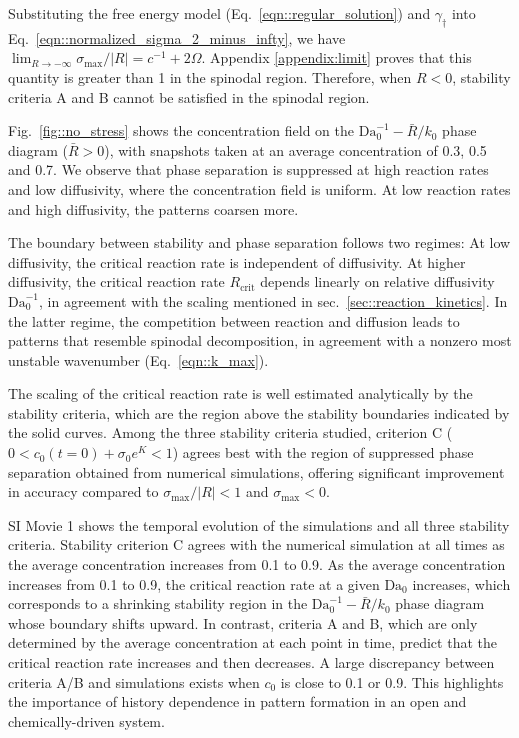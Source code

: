 \documentclass[reprint,aps,pre,superscriptaddress]{revtex4-2}
\begin{document}
Substituting the free energy model (Eq.~\ref{eqn::regular_solution}) and $\gamma_\dagger$ into Eq.~\ref{eqn::normalized_sigma_2_minus_infty},
we have $\lim_{R\to-\infty}{\sigma_\text{max}/|R|}=c^{-1}+2\Omega$. Appendix \ref{appendix:limit} proves that this quantity is greater than 1 in the spinodal region.
Therefore, when $R<0$, stability criteria A and B cannot be satisfied in the spinodal region.


Fig.~\ref{fig::no_stress} shows the concentration field on the $\text{Da}_0^{-1}-\bar{R}/k_0$ phase diagram ($\bar{R}>0$), with snapshots taken at an average concentration of 0.3, 0.5 and 0.7. We observe that phase separation is suppressed at high reaction rates and low diffusivity, where the concentration field is uniform.
At low reaction rates and high diffusivity, the patterns coarsen more.

The boundary between stability and phase separation follows two regimes: At low diffusivity, the critical reaction rate is independent of diffusivity. At higher diffusivity, the critical reaction rate $R_\text{crit}$ depends linearly on relative diffusivity $\text{Da}_0^{-1}$, in agreement with the scaling mentioned in sec.~\ref{sec::reaction_kinetics}.
In the latter regime, the competition between reaction and diffusion leads to patterns that resemble spinodal decomposition, in agreement with a nonzero most unstable wavenumber (Eq.~\ref{eqn::k_max}).

The scaling of the critical reaction rate is well estimated analytically by the stability criteria, which are the region above the stability boundaries indicated by the solid curves.
Among the three stability criteria studied, criterion C ($0<c_0(t=0)+\sigma_0 e^{K}<1$) agrees best with the region of suppressed phase separation obtained from numerical simulations, offering significant improvement in accuracy compared to $\sigma_\text{max}/|R|<1$ and $\sigma_\text{max}<0$.

SI Movie 1 shows the temporal evolution of the simulations and all three stability criteria. Stability criterion C agrees with the numerical simulation at all times as the average concentration increases from 0.1 to 0.9. As the average concentration increases from 0.1 to 0.9, the critical reaction rate at a given $\text{Da}_0$ increases, which corresponds to a shrinking stability region in the $\text{Da}_0^{-1}-\bar{R}/k_0$ phase diagram whose boundary shifts upward. In contrast, criteria A and B, which are only determined by the average concentration at each point in time, predict that the critical reaction rate increases and then decreases. A large discrepancy between criteria A/B and simulations exists when $c_0$ is close to 0.1 or 0.9. This highlights the importance of history dependence in pattern formation in an open and chemically-driven system.
\end{document}
